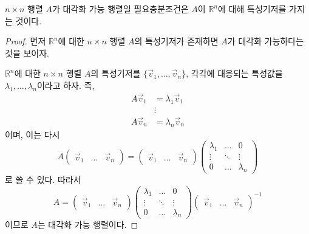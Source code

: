 \documentclass[../engineering_mathematics_lecture_note.tex]{subfiles}
\begin{document}
\begin{theorem}
    $n \times n$ 행렬 $A$가 대각화 가능 행렬일 필요충분조건은 $A$이 $\mathbb R^n$에 대해 특성기저를 가지는 것이다.
\end{theorem}

\begin{proof}
    먼저 $\mathbb R^n$에 대한 $n \times n$ 행렬 $A$의 특성기저가 존재하면 $A$가 대각화 가능하다는 것을 보이자.

    $\mathbb R^n$에 대한 $n \times n$ 행렬 $A$의 특성기저를 $\{\vec v_1, \dots, \vec v_n\}$, 각각에 대응되는 특성값을 $\lambda_1, \dots, \lambda_n$이라고 하자.
    즉,
    \begin{align*}
        A\vec v_1 &= \lambda_1 \vec v_1\\
                  &\vdots\\
        A\vec v_n &= \lambda_n \vec v_n
    \end{align*}
    이며, 이는 다시
    \begin{equation*}
        A
        \begin{pmatrix}
            \vec v_1 & \dots & \vec v_n
        \end{pmatrix}
        =
        \begin{pmatrix}
            \vec v_1 & \dots & \vec v_n
        \end{pmatrix}
        \begin{pmatrix}
            \lambda_1 & \dots & 0\\
            \vdots & \ddots & \vdots\\
            0 & \dots & \lambda_n
        \end{pmatrix}
    \end{equation*}
    로 쓸 수 있다.
    따라서
    \begin{equation*}
        A
        =
        \begin{pmatrix}
            \vec v_1 & \dots & \vec v_n
        \end{pmatrix}
        \begin{pmatrix}
            \lambda_1 & \dots & 0\\
            \vdots & \ddots & \vdots\\
            0 & \dots & \lambda_n
        \end{pmatrix}
        \begin{pmatrix}
            \vec v_1 & \dots & \vec v_n
        \end{pmatrix}^{-1}
    \end{equation*}
    이므로 $A$는 대각화 가능 행렬이다.


\end{proof}
\end{document}
